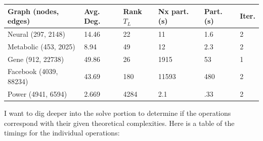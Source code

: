 \documentclass{article}
\begin{document}
\begin{center}
\renewcommand{\arraystretch}{1.5}
    \begin{tabular}{| l | l | l | l | l | l |}
    \hline
    Graph (nodes, edges) & Avg. Deg. & Rank $T_L$ & Nx part. (s) & Part. (s) & Iter. \\ \hline
    Neural (297, 2148) & 14.46 & 22 & 11 & 1.6 & 2 \\ \hline
    Metabolic (453, 2025) & 8.94 & 49 & 12 & 2.3 & 2 \\  \hline
    Gene (912, 22738) & 49.86 & 26 & 1915 & 53 & 1 \\ \hline
    Facebook (4039, 88234) & 43.69 &  180 & 11593 & 480 & 2 \\ \hline
    Power (4941, 6594) & 2.669 & 4284 & 2.1 & .33 & 2 \\ 
    \hline
    \end{tabular}
\end{center}
I want to dig deeper into the solve portion to determine if the operations correspond with their given theoretical complexities. Here is a table of the timings for the individual operations:\\
\end{document}

